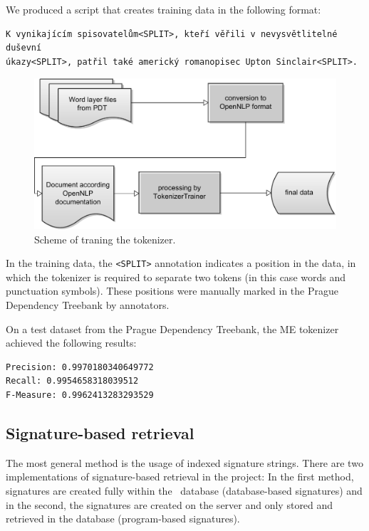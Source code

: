 We produced a script that creates training data in the following format:
\begin{verbatim}
K vynikajícím spisovatelům<SPLIT>, kteří věřili v nevysvětlitelné duševní 
úkazy<SPLIT>, patřil také americký romanopisec Upton Sinclair<SPLIT>.
\end{verbatim}

\begin{figure}[h]
\begin{center}
\includegraphics[scale=0.6]{figures/creatingTokenizationModel.pdf}
\end{center}
\caption{Scheme of traning the tokenizer.}
\label{fig:tokenizer}
\end{figure}

In the training data, the \verb|<SPLIT>| annotation indicates a position in the data, in which the
tokenizer is required to separate two tokens (in this case words and punctuation symbols). These
positions were manually marked in the Prague Dependency Treebank by annotators.

On a test dataset from the Prague Dependency Treebank, the ME tokenizer achieved the following results:

\begin{lstlisting}
Precision: 0.9970180340649772
Recall: 0.9954658318039512
F-Measure: 0.9962413283293529
\end{lstlisting}





\subsection{Signature-based retrieval}


The most general method is the usage of indexed signature strings. There are two implementations of signature-based retrieval in the project: In the first method, signatures are created fully within the \postgres~database (database-based signatures) and in the second, the signatures are created on the server and only stored and retrieved in the
database (program-based signatures).  


